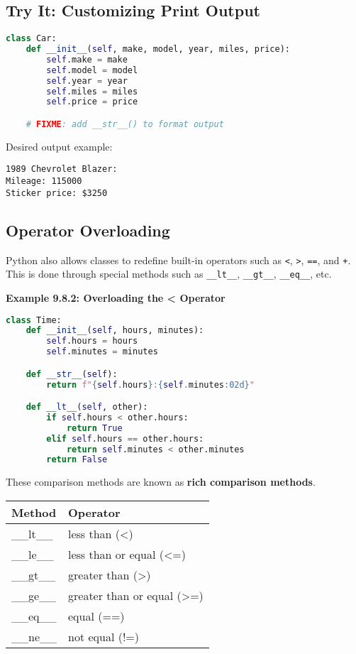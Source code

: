 \subsection*{Try It: Customizing Print Output}

\begin{lstlisting}[language=Python]
class Car:
    def __init__(self, make, model, year, miles, price):
        self.make = make
        self.model = model
        self.year = year
        self.miles = miles
        self.price = price

    # FIXME: add __str__() to format output
\end{lstlisting}

\noindent
Desired output example:
\begin{verbatim}
1989 Chevrolet Blazer:
Mileage: 115000
Sticker price: $3250
\end{verbatim}

\subsection*{Operator Overloading}

Python also allows classes to redefine built-in operators such as \texttt{<}, \texttt{>}, \texttt{==}, and
\texttt{+}.  This is done through special methods such as \texttt{\_\_lt\_\_}, \texttt{\_\_gt\_\_},
\texttt{\_\_eq\_\_}, etc.

\textbf{Example 9.8.2: Overloading the < Operator}

\begin{lstlisting}[language=Python]
class Time:
    def __init__(self, hours, minutes):
        self.hours = hours
        self.minutes = minutes

    def __str__(self):
        return f"{self.hours}:{self.minutes:02d}"

    def __lt__(self, other):
        if self.hours < other.hours:
            return True
        elif self.hours == other.hours:
            return self.minutes < other.minutes
        return False
\end{lstlisting}

\noindent
These comparison methods are known as \textbf{rich comparison methods}.
\begin{center}
\begin{tabular}{ll}
\textbf{Method} & \textbf{Operator} \\
\hline
\_\_lt\_\_ & less than (<) \\
\_\_le\_\_ & less than or equal (<=) \\
\_\_gt\_\_ & greater than (>) \\
\_\_ge\_\_ & greater than or equal (>=) \\
\_\_eq\_\_ & equal (==) \\
\_\_ne\_\_ & not equal (!=) \\
\end{tabular}
\end{center}

